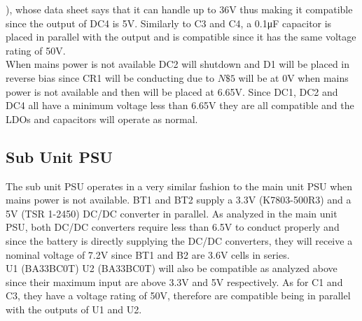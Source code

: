 ), whose data sheet\cite{L7805CV} says that it can handle up to 36\si{\V} thus making it compatible since the output of DC4 is 5\si{\V}. Similarly to C3 and C4, a 0.1\si{\micro\farad} capacitor is placed in parallel with the output and is compatible since it has the same voltage rating of 50\si{\V}.\\ When mains power is not available DC2 will shutdown and D1 will be placed in reverse bias since CR1 will be conducting due to $N\$5$ will be at 0\si{\V} when mains power is not available and then will be placed at 6.65\si{\V}. Since DC1, DC2 and DC4 all have a minimum voltage less than 6.65\si{\V} they are all compatible and the LDOs and capacitors will operate as normal.
\subsection{Sub Unit PSU}
The sub unit PSU operates in a very similar fashion to the main unit PSU when mains power is not available. BT1 and BT2 supply a 3.3\si{\V} (K7803-500R3) \cite{K7803500R3} and a 5\si{\V} (TSR 1-2450) \cite{TSR12450} DC/DC converter in parallel. As analyzed in the main unit PSU, both DC/DC converters require less than 6.5\si{\V} to conduct properly and since the battery is directly supplying the DC/DC converters, they will receive a nominal voltage of 7.2\si{\V} since BT1 and B2 are 3.6\si{\V} cells in series.\\ U1 (BA33BC0T) \cite{BA33BC0T} U2 (BA33BC0T) will also be compatible as analyzed above since their maximum input are above 3.3\si{\V} and 5\si{\V} respectively. As for C1 and C3, they have a voltage rating of 50\si{\V}, therefore are compatible being in parallel with the outputs of U1 and U2.
